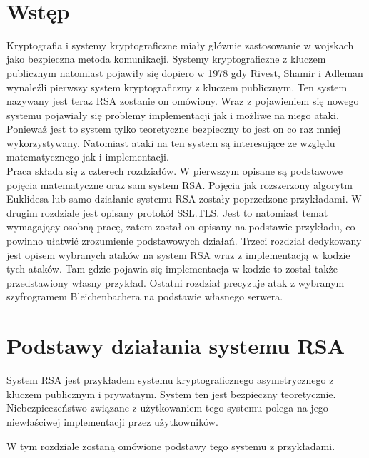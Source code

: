 \documentclass[12pt,twoside,a4]{mwbk}
\theoremstyle{definition}
\begin{document}
\newpage
\mbox{ }

\newpage
\pagestyle{fancy}
\tableofcontents



\chapter*{Wstęp}
Kryptografia i systemy kryptograficzne miały głównie zastosowanie w wojskach jako bezpieczna metoda komunikacji. Systemy kryptograficzne z kluczem publicznym natomiast pojawiły się dopiero w 1978 gdy Rivest, Shamir i Adleman wynaleźli pierwszy system kryptograficzny z kluczem publicznym. Ten system nazywany jest teraz RSA zostanie on omówiony. Wraz z pojawieniem się nowego systemu pojawiały się problemy implementacji jak i możliwe na niego ataki. Ponieważ jest to system tylko teoretyczne bezpieczny to jest on co raz mniej wykorzystywany. Natomiast ataki na ten system są interesujące ze względu matematycznego jak i implementacji. \\

Praca składa się z czterech rozdziałów. W pierwszym opisane są podstawowe pojęcia matematyczne oraz sam system RSA. Pojęcia jak rozszerzony algorytm Euklidesa lub samo działanie systemu RSA zostały poprzedzone przykładami. W drugim rozdziale jest opisany protokół SSL.TLS. Jest to natomiast temat wymagający osobną pracę, zatem został on opisany na podstawie przykładu, co powinno ułatwić zrozumienie podstawowych działań. Trzeci rozdział dedykowany jest opisem wybranych ataków na system RSA wraz z implementacją w kodzie tych ataków. Tam gdzie pojawia się implementacja w kodzie to został także przedstawiony własny przykład. Ostatni rozdział precyzuje atak z wybranym szyfrogramem Bleichenbachera na podstawie własnego serwera.




\chapter{Podstawy działania systemu RSA}
System RSA jest przykładem systemu kryptograficznego asymetrycznego z kluczem publicznym i prywatnym. System ten jest bezpieczny teoretycznie. Niebezpieczeństwo związane z użytkowaniem tego systemu polega na jego niewłaściwej implementacji przez użytkowników. \\ \par
W tym rozdziale zostaną omówione podstawy tego systemu z przykładami.
\end{document}
